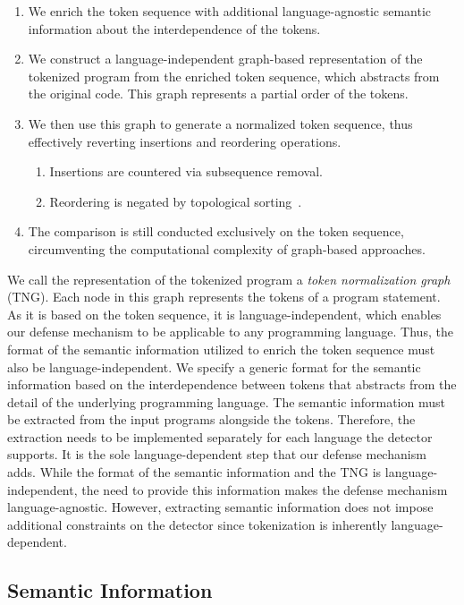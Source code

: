 \begin{enumerate}
    \item We enrich the token sequence with additional language-agnostic semantic information about the interdependence of the tokens.
    \item We construct a language-independent graph-based representation of the tokenized program from the enriched token sequence, which abstracts from the original code. This graph represents a partial order of the tokens.
    \item We then use this graph to generate a normalized token sequence, thus effectively reverting insertions and reordering operations.
    \begin{enumerate}
        \item Insertions are countered via subsequence removal.
        \item Reordering is negated by topological sorting~\cite{kahn1962}.
    \end{enumerate}
    \item The comparison is still conducted exclusively on the token sequence, circumventing the computational complexity of graph-based approaches.
\end{enumerate}

\noindent
We call the representation of the tokenized program a \textit{token normalization graph} (TNG).
Each node in this graph represents the tokens of a program statement.
As it is based on the token sequence, it is language-independent, which enables our defense mechanism to be applicable to any programming language.
Thus, the format of the semantic information utilized to enrich the token sequence must also be language-independent.
%
We specify a generic format for the semantic information based on the interdependence between tokens that abstracts from the detail of the underlying programming language.
The semantic information must be extracted from the input programs alongside the tokens.
Therefore, the extraction needs to be implemented separately for each language the detector supports.
It is the sole language-dependent step that our defense mechanism adds.
While the format of the semantic information and the TNG is language-independent, the need to provide this information makes the defense mechanism language-agnostic.
However, extracting semantic information does not impose additional constraints on the detector since tokenization is inherently language-dependent.


\subsection{Semantic Information}

